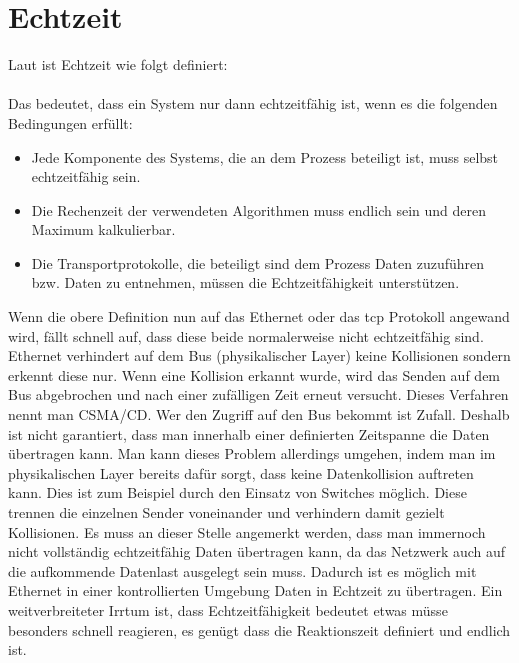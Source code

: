 \section{Echtzeit}
Laut \citet{Scholz:2005} ist Echtzeit wie folgt definiert:\\
\\
Das bedeutet, dass ein System nur dann echtzeitfähig ist, wenn es die folgenden Bedingungen erfüllt:
\begin{itemize}
  \item Jede Komponente des Systems, die an dem Prozess beteiligt ist, muss selbst echtzeitfähig sein.
  \item Die Rechenzeit der verwendeten Algorithmen muss endlich sein und deren Maximum kalkulierbar.
  \item Die Transportprotokolle, die beteiligt sind dem Prozess Daten zuzuführen bzw. Daten zu entnehmen, müssen die Echtzeitfähigkeit unterstützen.
\end{itemize}
Wenn die obere Definition nun auf das Ethernet oder das \ac{tcp} Protokoll angewand wird, fällt schnell auf, 
dass diese beide normalerweise nicht echtzeitfähig sind.
Ethernet verhindert auf dem Bus (physikalischer Layer) keine Kollisionen sondern erkennt diese nur. 
Wenn eine Kollision erkannt wurde, 
wird das Senden auf dem Bus abgebrochen und nach einer zufälligen Zeit erneut versucht.
Dieses Verfahren nennt man \ac{CSMA/CD}. 
Wer den Zugriff auf den Bus bekommt ist Zufall.
Deshalb ist nicht garantiert, dass man innerhalb einer definierten Zeitspanne die Daten übertragen kann.
Man kann dieses Problem allerdings umgehen, indem man im physikalischen Layer bereits dafür sorgt, 
dass keine Datenkollision auftreten kann. Dies ist zum Beispiel durch den Einsatz von Switches möglich.
Diese trennen die einzelnen Sender voneinander und verhindern damit gezielt Kollisionen.
Es muss an dieser Stelle angemerkt werden, dass man immernoch nicht vollständig echtzeitfähig Daten übertragen kann, 
da das Netzwerk auch auf die aufkommende Datenlast ausgelegt sein muss.
Dadurch ist es möglich mit Ethernet in einer kontrollierten Umgebung Daten in Echtzeit zu übertragen.
Ein weitverbreiteter Irrtum ist, dass Echtzeitfähigkeit bedeutet etwas müsse besonders schnell reagieren, 
es genügt dass die Reaktionszeit definiert und endlich ist.